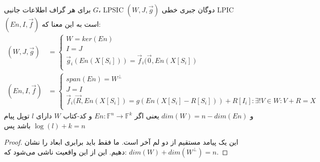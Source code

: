 \begin{theorem}
    \label{thm1}
    برای هر گراف اطلاعات جانبی $G$، LPSIC $(W, J, \overrightarrow{g})$ دوگان جبری خطی LPIC $(En, I, \overrightarrow{f})$ است به این معنا که:
    \begin{align*}
    (W, J, \overrightarrow{g}) &= \begin{cases}
                                      W = ker(En)\\
                                      I = J \\
                                      \overrightarrow{g}_i(En(X[S_i])) = \overrightarrow{f}_i(\overrightarrow{0}, En(X[S_i])\\
    \end{cases} \\
    (En, I, \overrightarrow{f}) &= \begin{cases}
                                       span(En) = W^{\bot} \\
                                       J = I \\
                                       \overrightarrow{f}_i(\overrightarrow{R}, En(X[S_i]) = g(En(X[S_i] - R[S_i])) + R[I_i]: \exists! V \in W: V + R = X \\
    \end{cases}
    \end{align*}
    و $dim(W) = n - dim(En)$ یعنی اگر $En: \mathbb{F}^n \rightarrow \mathbb{F}^k$ و کد-کتاب $W$ دارای $l$ توپل پیام باشد پس $\log(l) + k = n$
\end{theorem}
\begin{proof}
    این یک پیامد مستقیم از دو لم آخر است. ما فقط باید برابری ابعاد را نشان دهیم. این از این واقعیت ناشی می‌شود که: $dim(W) + dim(W^{\bot}) = n$.
\end{proof}
